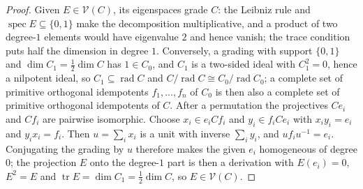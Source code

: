 \documentclass[11pt]{amsart}
\theoremstyle{plain}
\theoremstyle{definition}
\DeclareMathOperator{\rad}{rad}
\DeclareMathOperator{\tr}{tr}
\newcommand{\cV}{\mathcal{V}}
\begin{document}
\begin{proof}
Given $E\in\cV(C)$, its eigenspaces grade $C$: the Leibniz rule and $\operatorname{spec}E\subseteq\{0,1\}$
make the decomposition multiplicative, and a product of two degree-$1$ elements would have eigenvalue $2$ and
hence vanish; the trace condition puts half the dimension in degree $1$. Conversely, a grading with support
$\{0,1\}$ and $\dim C_1=\tfrac12\dim C$ has $1\in C_0$, and $C_1$ is a two-sided ideal with $C_1^2=0$, hence a
nilpotent ideal, so $C_1\subseteq\rad C$ and $C/\rad C\cong C_0/\rad C_0$; a complete set of primitive
orthogonal idempotents $f_1,\dots,f_n$ of $C_0$ is then also a complete set of primitive orthogonal
idempotents of $C$. After a permutation the projectives $Ce_i$ and $Cf_i$ are pairwise isomorphic. Choose
$x_i\in e_iCf_i$ and $y_i\in f_iCe_i$ with $x_iy_i=e_i$ and $y_ix_i=f_i$. Then $u=\sum_i x_i$ is a unit with
inverse $\sum_i y_i$, and $uf_iu^{-1}=e_i$. Conjugating the grading by $u$ therefore makes the given $e_i$
homogeneous of degree $0$; the projection $E$ onto the degree-$1$ part is then a derivation with $E(e_i)=0$,
$E^2=E$ and $\tr E=\dim C_1=\tfrac12\dim C$, so $E\in\cV(C)$.
\end{proof}
\end{document}
